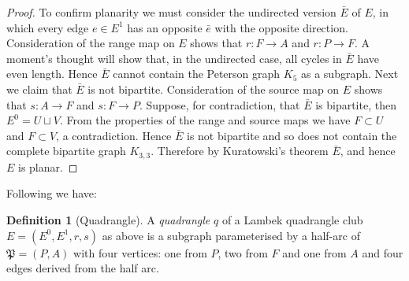 \documentclass[12pt]{amsart}
\theoremstyle{definition}
\newtheorem{dfn}[thm]{Definition}
\theoremstyle{remark}
\numberwithin{equation}{section}
\begin{document}
\begin{proof}
To confirm planarity we must consider the undirected version $\bar{E}$ of $E$, in which every edge $e \in E^1$ has an opposite $\bar{e}$ with the opposite  direction. Consideration of the range map on $E$ shows that $r : F \to A$ and $r : P \to F$. A moment's thought will show that, in the undirected case, all cycles in $\bar{E}$ have even length. Hence $\bar{E}$ cannot contain the Peterson graph $K_5$ as a subgraph. Next we claim that $\bar{E}$ is not bipartite. Consideration of the source map on $E$ shows that $s : A \to F$ and $s : F \to P$. Suppose, for contradiction, that $\bar{E}$ is bipartite, then $E^0 = U \sqcup V$. From the properties of the range and source maps we have  $F \subset U$ and $F \subset V$, a contradiction. Hence $\bar{E}$ is not bipartite and so does not contain the complete bipartite graph $K_{3,3}$. Therefore by Kuratowski's theorem 
\cite[Th\'{e}or\`{e}me B]{Kur} $\bar{E}$, and hence $E$ is planar.
\end{proof}

\noindent
Following \cite[Definition 1.1(3)]{Johnstone} we have:

\begin{dfn}[Quadrangle] \label{dfn:addquads}
A \emph{quadrangle} $q$ of a Lambek quadrangle club $E=(E^0, E^1, r, s)$ as above is a subgraph parameterised by a half-arc of $\mathfrak{P}=(P,A)$ with four vertices: one from $P$, two from $F$ and one from $A$ and four edges derived from the half arc.
\end{dfn}
\end{document}
